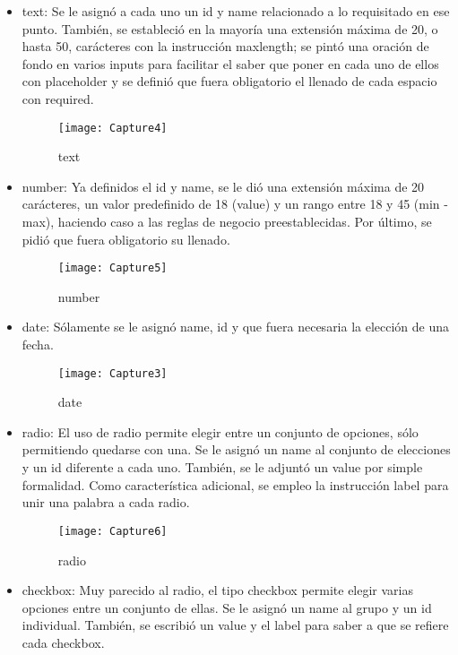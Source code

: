\documentclass[10pt,a4paper]{article}
\begin{document}
\begin{itemize}
	\item  text: Se le asignó a cada uno un id y name relacionado a lo requisitado en ese punto. También, se estableció en la mayoría una extensión máxima de 20, o hasta 50, carácteres con la instrucción maxlength; se pintó una oración de fondo en varios inputs para facilitar el saber que poner en cada uno de ellos con placeholder y se definió que fuera obligatorio el llenado de cada espacio con required.
	
	\begin{figure}[H]
		\texttt{[image: Capture4]}
		\centering
		\caption{text}
		\label{img:Capture4}
	\end{figure} 
	
	\item  number: Ya definidos el id y name, se le dió una extensión máxima de 20 carácteres, un valor predefinido de 18 (value) y un rango entre 18 y 45 (min - max), haciendo caso a las reglas de negocio preestablecidas. Por último, se pidió que fuera obligatorio su llenado.
	
	\begin{figure}[H]
		\texttt{[image: Capture5]}
		\centering
		\caption{number}
		\label{img:Capture5}
	\end{figure} 
	
	\item  date: Sólamente se le asignó name, id y que fuera necesaria la elección de una fecha.
	
	\begin{figure}[H]
		\texttt{[image: Capture3]}
		\centering
		\caption{date}
		\label{img:Capture3}
	\end{figure} 
	
	\pagebreak	
	
	\item  radio: El uso de radio permite elegir entre un conjunto de opciones, sólo permitiendo quedarse con una. Se le asignó un name al conjunto de elecciones y un id diferente a cada uno. También, se le adjuntó un value por simple formalidad. Como característica adicional, se empleo la instrucción label para unir una palabra a cada radio.
	
	\begin{figure}[H]
		\texttt{[image: Capture6]}
		\centering
		\caption{radio}
		\label{img:Capture6}
	\end{figure} 
	
	\item  checkbox: Muy parecido al radio, el tipo checkbox permite elegir varias opciones entre un conjunto de ellas. Se le asignó un name al grupo y un id individual. También, se escribió un value y el label para saber a que se refiere cada checkbox.
	

\end{itemize}
\end{document}
